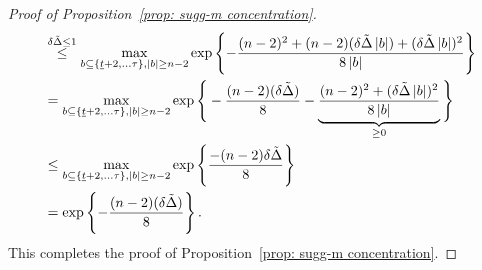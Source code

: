 \begin{proof}[Proof of Proposition~\ref{prop: sugg-m concentration}]
\begin{align*}
& \stackrel{\delta \tilde\Delta \leq 1}{\leq}  \max_{b\subseteq \{\underline{t}+2,\dots \tau \}, \left\lvert b\right\rvert\geq n-2} \exp\left\{-\frac{(n-2)^2+(n-2)(\delta \tilde\Delta \left\lvert b\right\rvert)+(\delta \tilde\Delta \left\lvert b\right\rvert)^2}{8\left\lvert b\right\rvert}\right\} \nonumber
\\
& =  \max_{b\subseteq \{\underline{t}+2,\dots \tau \}, \left\lvert b\right\rvert\geq n-2} \exp\Bigg\{-\frac{(n-2)(\delta \tilde\Delta)}{8}-\underbrace{\frac{(n-2)^2+(\delta \tilde\Delta \left\lvert b\right\rvert)^2}{8\left\lvert b\right\rvert}}_{\geq 0}\Bigg\} \nonumber \\
& \leq  \max_{b\subseteq \{\underline{t}+2,\dots \tau \}, \left\lvert b\right\rvert\geq n-2} \exp\left\{\frac{-(n-2)\delta \tilde\Delta}{8}\right\} \nonumber \\
& = \exp\left\{-\frac{(n-2)(\delta \tilde\Delta)}{8}\right\}.
\end{align*}
This completes the proof of Proposition~\ref{prop: sugg-m concentration}.
\end{proof}



